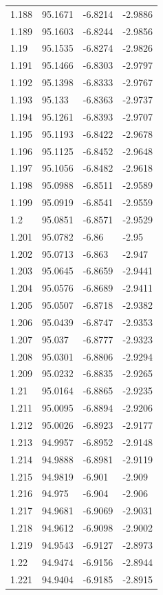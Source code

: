 \begin{tabular}{llll}
1.188 & 95.1671 & -6.8214 & -2.9886 \\
1.189 & 95.1603 & -6.8244 & -2.9856 \\
1.19 & 95.1535 & -6.8274 & -2.9826 \\
1.191 & 95.1466 & -6.8303 & -2.9797 \\
1.192 & 95.1398 & -6.8333 & -2.9767 \\
1.193 & 95.133 & -6.8363 & -2.9737 \\
1.194 & 95.1261 & -6.8393 & -2.9707 \\
1.195 & 95.1193 & -6.8422 & -2.9678 \\
1.196 & 95.1125 & -6.8452 & -2.9648 \\
1.197 & 95.1056 & -6.8482 & -2.9618 \\
1.198 & 95.0988 & -6.8511 & -2.9589 \\
1.199 & 95.0919 & -6.8541 & -2.9559 \\
1.2 & 95.0851 & -6.8571 & -2.9529 \\
1.201 & 95.0782 & -6.86 & -2.95 \\
1.202 & 95.0713 & -6.863 & -2.947 \\
1.203 & 95.0645 & -6.8659 & -2.9441 \\
1.204 & 95.0576 & -6.8689 & -2.9411 \\
1.205 & 95.0507 & -6.8718 & -2.9382 \\
1.206 & 95.0439 & -6.8747 & -2.9353 \\
1.207 & 95.037 & -6.8777 & -2.9323 \\
1.208 & 95.0301 & -6.8806 & -2.9294 \\
1.209 & 95.0232 & -6.8835 & -2.9265 \\
1.21 & 95.0164 & -6.8865 & -2.9235 \\
1.211 & 95.0095 & -6.8894 & -2.9206 \\
1.212 & 95.0026 & -6.8923 & -2.9177 \\
1.213 & 94.9957 & -6.8952 & -2.9148 \\
1.214 & 94.9888 & -6.8981 & -2.9119 \\
1.215 & 94.9819 & -6.901 & -2.909 \\
1.216 & 94.975 & -6.904 & -2.906 \\
1.217 & 94.9681 & -6.9069 & -2.9031 \\
1.218 & 94.9612 & -6.9098 & -2.9002 \\
1.219 & 94.9543 & -6.9127 & -2.8973 \\
1.22 & 94.9474 & -6.9156 & -2.8944 \\
1.221 & 94.9404 & -6.9185 & -2.8915 \\

\end{tabular}
